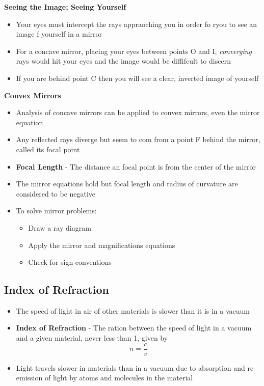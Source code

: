 \textbf{Seeing the Image; Seeing Yourself}
\begin{itemize}
    \item Your eyes must intercept the rays appraoching you in order fo ryou to see an image f yourself in a mirror
    \item For a concave mirror, placing your eyes between points O and I, \emph{converging} rays would hit your eyes and the image would be diffifcult to discern
    \item If you are behind point C then you will see a clear, inverted image of yourself
\end{itemize}

\textbf{Convex Mirrors}
\begin{itemize}
    \item Analysis of concave mirrors can be applied to convex mirrors, even the mirror equation
    \item Any reflected rays diverge but seem to com from a point F behind the mirror, called its focal point
    \item \textbf{Focal Length} - The distance an focal point is from the center of the mirror
    \item The mirror equations hold but focal length and radius of curvature are considered to be negative
    \item To solve mirror problems:
    \begin{itemize}
        \item Draw a ray diagram
        \item Apply the mirror and magnifications equations
        \item Check for sign conventions
    \end{itemize}
\end{itemize}

\subsection{Index of Refraction}
\begin{itemize}
    \item The speed of light in air of other materials is slower than it is in a vacuum
    \item \textbf{Index of Refraction} - The ration between the speed of light in a vacuum and a given material, never less than 1, given by \[n=\frac{c}{v}\]
    \item Light travels slower in materials than in a vacuum due to absorption and re emission of light by atoms and molecules in the material
\end{itemize}

